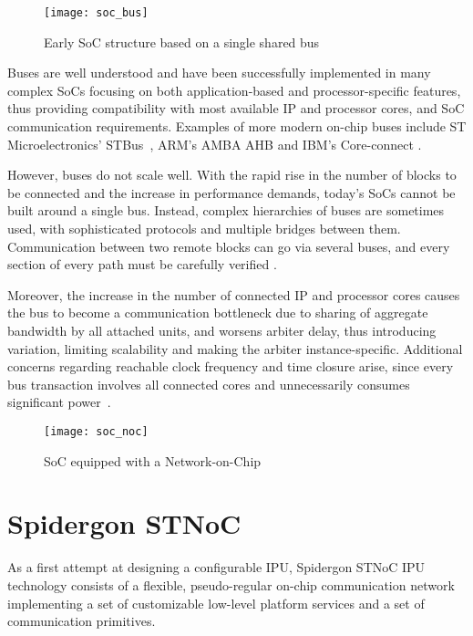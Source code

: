 	\begin{figure}[ht]
	\centering
		\texttt{[image: soc\_bus]}
		\caption{Early SoC structure based on a single shared bus}
		\label{fig:soc_bus}
	\end{figure} 

Buses are well understood and have been successfully implemented in many complex SoCs focusing on both application-based and processor-specific features, thus providing compatibility with most available IP and processor cores, and SoC communication requirements. Examples of more modern on-chip buses include ST Microelectronics' STBus~\cite{scandurra2002stbus}, ARM's AMBA AHB and IBM's Core-connect \cite{ryu2001comparison}.

However, buses do not scale well. With the rapid rise in the number of blocks to be connected and the
increase in performance demands, today's SoCs cannot be built around a single bus. Instead, complex hierarchies of buses are sometimes used, with sophisticated protocols and multiple bridges between them.
Communication between two remote blocks can go via several buses, and every section of every path must be carefully verified \cite{furber2005future}. 

Moreover, the increase in the number of connected IP and processor cores causes the bus to become a communication bottleneck due to sharing of aggregate bandwidth by all attached units, and worsens arbiter delay, thus introducing variation, limiting scalability and making the arbiter instance-specific. Additional concerns regarding reachable clock frequency and time closure arise, since every bus transaction involves all connected cores and unnecessarily consumes significant power~\cite{coppola2008design}.


	\begin{figure}[ht]
	\centering
		\texttt{[image: soc\_noc]}
		\caption{SoC equipped with a Network-on-Chip}
		\label{fig:soc_noc}
	\end{figure} 

\section{Spidergon STNoC}\label{C:stnoc}

As a first attempt at designing a configurable IPU, Spidergon STNoC IPU technology consists of a flexible, pseudo-regular on-chip communication network implementing a set of customizable low-level platform services and a set of communication primitives.

